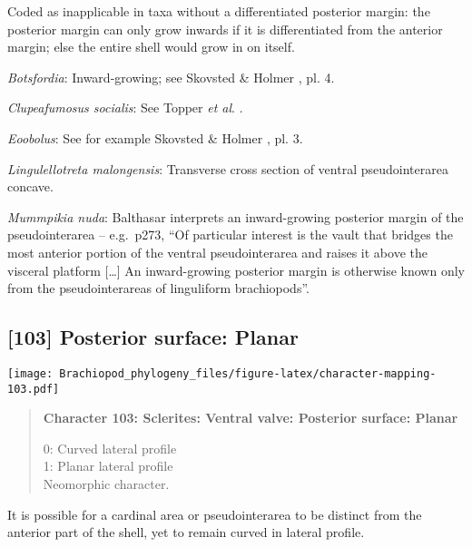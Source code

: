 \documentclass[openany]{book}
\theoremstyle{definition}
\theoremstyle{definition}
\theoremstyle{definition}
\theoremstyle{remark}
\begin{document}
Coded as inapplicable in taxa without a differentiated posterior margin:
the posterior margin can only grow inwards if it is differentiated from
the anterior margin; else the entire shell would grow in on itself.

\hypertarget{Botsfordia-coding-102}{}
\emph{Botsfordia}: Inward-growing; see Skovsted \& Holmer
\citeyearpar{Skovsted2005EarlyCambrian}, pl. 4.

\hypertarget{Clupeafumosus_socialis-coding-102}{}
\emph{Clupeafumosus socialis}: See Topper \emph{et al}.
\citeyearpar{Topper2013Reappraisalof}.

\hypertarget{Eoobolus-coding-102}{}
\emph{Eoobolus}: See for example Skovsted \& Holmer
\citeyearpar{Skovsted2005EarlyCambrian}, pl. 3.

\hypertarget{Lingulellotreta_malongensis-coding-102}{}
\emph{Lingulellotreta malongensis}: Transverse cross section of ventral
pseudointerarea concave.

\hypertarget{Mummpikia_nuda-coding-102}{}
\emph{Mummpikia nuda}: Balthasar \citeyearpar{Balthasar2008iMummpikia}
interprets an inward-growing posterior margin of the pseudointerarea --
e.g.~p273, ``Of particular interest is the vault that bridges the most
anterior portion of the ventral pseudointerarea and raises it above the
visceral platform {[}\ldots{}{]} An inward-growing posterior margin is
otherwise known only from the pseudointerareas of linguliform
brachiopods''.

\subsection*{{[}103{]} Posterior surface:
Planar}\label{posterior-surface-planar}

\texttt{[image: Brachiopod\_phylogeny\_files/figure-latex/character-mapping-103.pdf]}

\begin{quote}
\textbf{Character 103: Sclerites: Ventral valve: Posterior surface:
Planar}

0: Curved lateral profile\\
1: Planar lateral profile\\
Neomorphic character.
\end{quote}

It is possible for a cardinal area or pseudointerarea to be distinct
from the anterior part of the shell, yet to remain curved in lateral
profile.
\end{document}
